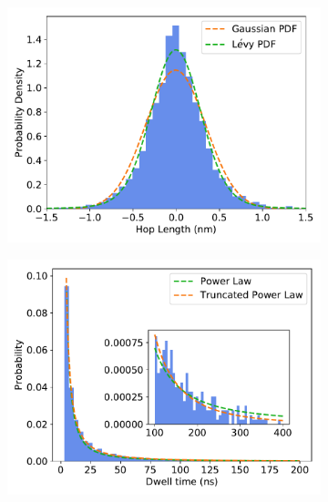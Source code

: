 \documentclass{article}
\begin{document}
\begin{figure}[h]
\begin{subfigure}{0.3\textwidth}
  \includegraphics[width=\textwidth]{gaussian_levy_comparison_anomalous_MET.pdf}
  \caption{}\label{fig:MET_hop_distribution_comparison}
  \end{subfigure}
  \begin{subfigure}{0.3\textwidth}
  \includegraphics[width=\textwidth]{MET_powerlaw.pdf}
  \caption{}\label{fig:MET_powerlaw}
  \end{subfigure}
  \begin{subfigure}{0.3\textwidth}

\end{subfigure}
\end{figure}
\end{document}
